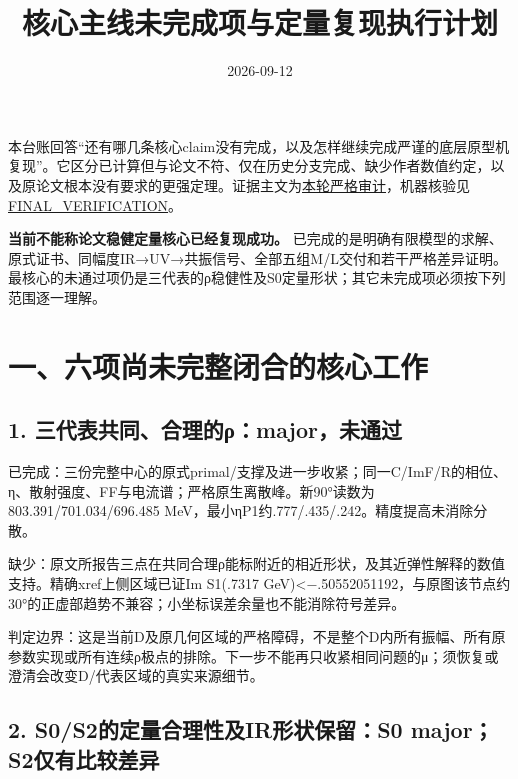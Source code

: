 \documentclass[
  10pt,
  a4paper,
]{article}
\title{核心主线未完成项与定量复现执行计划}
\author{}
\date{2026-09-12}
\begin{document}
\maketitle

本台账回答``还有哪几条核心claim没有完成，以及怎样继续完成严谨的底层原型机复现''。它区分已计算但与论文不符、仅在历史分支完成、缺少作者数值约定，以及原论文根本没有要求的更强定理。证据主文为\href{../MAJOR_CLAIMS_ZH.md}{本轮严格审计}，机器核验见\href{../FINAL_VERIFICATION.json}{FINAL\_VERIFICATION}。

\textbf{当前不能称论文稳健定量核心已经复现成功。}
已完成的是明确有限模型的求解、原式证书、同幅度IR→UV→共振信号、全部五组M/L交付和若干严格差异证明。最核心的未通过项仍是三代表的ρ稳健性及S0定量形状；其它未完成项必须按下列范围逐一理解。

\begingroup
\small
\setlength{\parskip}{0pt}
\setcounter{tocdepth}{2}
\tableofcontents
\endgroup
\clearpage

\section{一、六项尚未完整闭合的核心工作}\label{ux4e00ux516dux9879ux5c1aux672aux5b8cux6574ux95edux5408ux7684ux6838ux5fc3ux5de5ux4f5c}

\subsection{1.
三代表共同、合理的ρ：major，未通过}\label{ux4e09ux4ee3ux8868ux5171ux540cux5408ux7406ux7684ux3c1majorux672aux901aux8fc7}

已完成：三份完整中心的原式primal/支撑及进一步收紧；同一C/ImF/R的相位、η、散射强度、FF与电流谱；严格原生离散峰。新90°读数为803.391/701.034/696.485
MeV，最小ηP1约.777/.435/.242。精度提高未消除分散。

缺少：原文所报告三点在共同合理ρ能标附近的相近形状，及其近弹性解释的数值支持。精确xref上侧区域已证Im
S1(.7317
GeV)\textless−.50552051192，与原图该节点约30°的正虚部趋势不兼容；小坐标误差余量也不能消除符号差异。

判定边界：这是当前D及原几何区域的严格障碍，不是整个D内所有振幅、所有原参数实现或所有连续ρ极点的排除。下一步不能再只收紧相同问题的μ；须恢复或澄清会改变D/代表区域的真实来源细节。

\subsection{2. S0/S2的定量合理性及IR形状保留：S0
major；S2仅有比较差异}\label{s0s2ux7684ux5b9aux91cfux5408ux7406ux6027ux53cairux5f62ux72b6ux4fddux7559s0-majors2ux4ec5ux6709ux6bd4ux8f83ux5deeux5f02}
\end{document}
